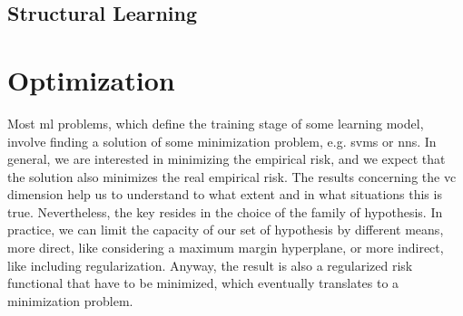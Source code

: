 




\subsection{Structural Learning}







\section{Optimization}
%
Most \acrshort{ml} problems, which define the training stage of some learning model, involve finding a solution of some minimization problem, e.g. \acrshort{svms} or \acrshort{nns}.
%
In general, we are interested in minimizing the empirical risk, and we expect that the solution also minimizes the real empirical risk. The results concerning the \acrshort{vc} dimension help us to understand to what extent and in what situations this is true. Nevertheless, the key resides in the choice of the family of hypothesis.
%
In practice, we can limit the capacity of our set of hypothesis by different means, more direct, like considering a maximum margin hyperplane, or more indirect, like including regularization. Anyway, the result is also a regularized risk functional that have to be minimized, which eventually translates to a minimization problem.

